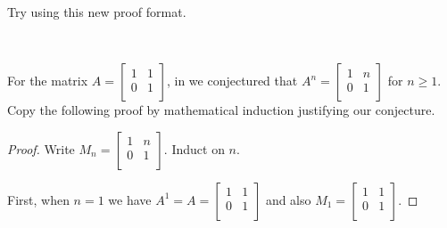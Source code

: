 Try using this new proof format.

\begin{act}
\label{act_math_ind_matrix}
~
    \begin{actpart}
        \item \label{part_shear_power} For the matrix $A = \left[ \begin{array}{cc} 1 & 1\\ 0 & 1 \\ \end{array} \right]$, in  we conjectured that $A^n=\left[ \begin{array}{cc} 1 & n\\ 0 & 1 \\ \end{array} \right]$ for $n \ge 1$.  Copy the following proof by mathematical induction justifying our conjecture.
            \begin{proof}
                Write $M_n=\left[ \begin{array}{cc} 1 & n\\ 0 & 1 \\ \end{array} \right]$.  Induct on $n$.  
                
                First, when $n=1$ we have $A^1 = A = \left[ \begin{array}{cc} 1 & 1\\ 0 & 1 \\ \end{array} \right]$ and also $M_1=\left[ \begin{array}{cc} 1 & 1\\ 0 & 1 \\ \end{array} \right]$.  
                    

\end{proof}
\end{actpart}
\end{act}
